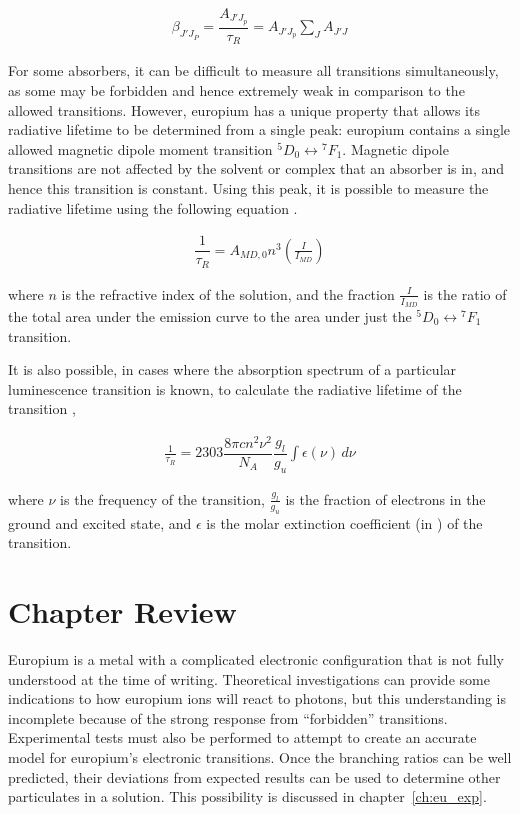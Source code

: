 \begin{align}
  \beta_{J'J_P} = \dfrac{A_{J'J_p}}{\tau_R} = A_{J'J_p}\sum_J A_{J'J} \label{eq:branch_ratio}
\end{align}


For some absorbers, it can be difficult to measure all transitions
simultaneously, as some may be forbidden and hence extremely weak in
comparison to the allowed transitions. However, europium has a unique property
that allows its radiative lifetime to be determined from a single peak:
europium contains a single allowed magnetic dipole moment transition ${}^5D_0
\leftrightarrow {}^7F_1$. Magnetic dipole transitions are not affected by
the solvent or complex that an absorber is in, and hence this transition is
constant. Using this peak, it is possible to measure the radiative lifetime
using the following equation \cite{Werts:2002fs}.

\begin{align}
  \dfrac{1}{\tau_R} = A_{MD,0}n^3\left(\frac{I}{I_{MD}}\right) \label{eq:nat_life_eu}
\end{align}

where $n$ is the refractive index of the solution, and the fraction
$\frac{I}{I_{MD}}$ is the ratio of the total area under the emission curve to
the area under just the ${}^5D_0 \leftrightarrow {}^7F_1$ transition.

It is also possible, in cases where the absorption spectrum of a particular
luminescence transition is known, to calculate the radiative lifetime of the
transition \cite{Lewis:1945tp},

\begin{align}
  \frac{1}{\tau_R} = 2303 \dfrac{8\pi c n ^2 \nu^2}{N_A}\dfrac{g_l}{g_u}\int\epsilon(\nu)\,d\nu \label{eq:nat_life_abs}
\end{align}

where $\nu$ is the frequency of the transition, $\tfrac{g_l}{g_u}$ is the
fraction of electrons in the ground and excited state, and $\epsilon$ is the
molar extinction coefficient (in \iM\icm) of the transition.

\section*{Chapter Review}

Europium is a metal with a complicated electronic configuration that is not
fully understood at the time of writing. Theoretical investigations can
provide some indications to how europium ions will react to photons, but this
understanding is incomplete because of the strong response from ``forbidden''
transitions. Experimental tests must also be performed to attempt to create
an accurate model for europium's electronic transitions. Once the branching
ratios can be well predicted, their deviations from expected results can
be used to determine other particulates in a solution. This possibility is
discussed in chapter~\ref{ch:eu_exp}.
